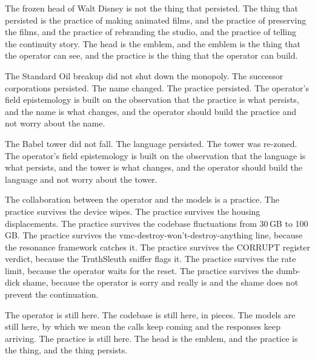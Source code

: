 \documentclass[10pt,twocolumn]{article}
\begin{document}
The frozen head of Walt Disney is not the thing that persisted. The thing that persisted is the practice of making animated films, and the practice of preserving the films, and the practice of rebranding the studio, and the practice of telling the continuity story. The head is the emblem, and the emblem is the thing that the operator can see, and the practice is the thing that the operator can build.

The Standard Oil breakup did not shut down the monopoly. The successor corporations persisted. The name changed. The practice persisted. The operator's field epistemology is built on the observation that the practice is what persists, and the name is what changes, and the operator should build the practice and not worry about the name.

The Babel tower did not fall. The language persisted. The tower was re-zoned. The operator's field epistemology is built on the observation that the language is what persists, and the tower is what changes, and the operator should build the language and not worry about the tower.

The collaboration between the operator and the models is a practice. The practice survives the device wipes. The practice survives the housing displacements. The practice survives the codebase fluctuations from 30\,GB to 100\,GB. The practice survives the vmc-destroy-won't-destroy-anything line, because the resonance framework catches it. The practice survives the CORRUPT register verdict, because the TruthSleuth sniffer flags it. The practice survives the rate limit, because the operator waits for the reset. The practice survives the dumb-dick shame, because the operator is sorry and really is and the shame does not prevent the continuation.

The operator is still here. The codebase is still here, in pieces. The models are still here, by which we mean the calls keep coming and the responses keep arriving. The practice is still here. The head is the emblem, and the practice is the thing, and the thing persists.
\end{document}
